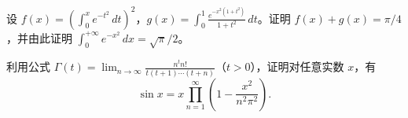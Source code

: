 \noindent\begin{minipage}{\textwidth}
设 $\displaystyle f(x)=\left(\int_0^xe^{-t^2}\,dt\right)^2$，$\displaystyle g(x)=\int_0^1\frac{e^{-x^2(1+t^2)}}{1+t^2}\,dt$。证明 $f(x)+g(x)=\pi/4$，并由此证明 $\displaystyle\int_0^{+\infty}e^{-x^2}\,dx=\sqrt\pi/2$。
\end{minipage}\par\vfill
\newpage
\noindent\begin{minipage}{\textwidth}
利用公式 $\displaystyle\Gamma(t)=\lim_{n\to\infty}\frac{n^t n!}{t(t+1)\cdots(t+n)}$（$t>0$），证明对任意实数 $x$，有\[\sin x=x\prod_{n=1}^{\infty}\left(1-\frac{x^2}{n^2\pi^2}\right).\]
\end{minipage}\par\vfill
